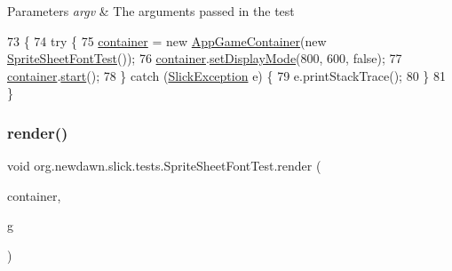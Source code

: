 \begin{DoxyParams}{Parameters}
{\em argv} & The arguments passed in the test \\
\hline
\end{DoxyParams}

\begin{DoxyCode}
73                                           \{
74       \textcolor{keywordflow}{try} \{
75          \mbox{\hyperlink{classorg_1_1newdawn_1_1slick_1_1tests_1_1_sprite_sheet_font_test_a815648868b0f6ece0eb2952a1faeaedf}{container}} = \textcolor{keyword}{new} \mbox{\hyperlink{classorg_1_1newdawn_1_1slick_1_1_app_game_container}{AppGameContainer}}(\textcolor{keyword}{new} 
      \mbox{\hyperlink{classorg_1_1newdawn_1_1slick_1_1tests_1_1_sprite_sheet_font_test_adf11cf3193647a23114886b5963e6616}{SpriteSheetFontTest}}());
76          \mbox{\hyperlink{classorg_1_1newdawn_1_1slick_1_1tests_1_1_sprite_sheet_font_test_a815648868b0f6ece0eb2952a1faeaedf}{container}}.\mbox{\hyperlink{classorg_1_1newdawn_1_1slick_1_1_app_game_container_aa2de68db61ddd3917a8edc0177ebdfe3}{setDisplayMode}}(800, 600, \textcolor{keyword}{false});
77          \mbox{\hyperlink{classorg_1_1newdawn_1_1slick_1_1tests_1_1_sprite_sheet_font_test_a815648868b0f6ece0eb2952a1faeaedf}{container}}.\mbox{\hyperlink{classorg_1_1newdawn_1_1slick_1_1_app_game_container_adcadc0e560e64d03be24c817931fdd54}{start}}();
78       \} \textcolor{keywordflow}{catch} (\mbox{\hyperlink{classorg_1_1newdawn_1_1slick_1_1_slick_exception}{SlickException}} e) \{
79          e.printStackTrace();
80       \}
81    \}
\end{DoxyCode}
\mbox{\label{classorg_1_1newdawn_1_1slick_1_1tests_1_1_sprite_sheet_font_test_ae5d38e883f23a0c129f0138eaa90af3e}} 
\subsubsection{\texorpdfstring{render()}{render()}}
{\footnotesize\ttfamily void org.\+newdawn.\+slick.\+tests.\+Sprite\+Sheet\+Font\+Test.\+render (\begin{DoxyParamCaption}\item[{\mbox{\hyperlink{classorg_1_1newdawn_1_1slick_1_1_game_container}{Game\+Container}}}]{container,  }\item[{\mbox{\hyperlink{classorg_1_1newdawn_1_1slick_1_1_graphics}{Graphics}}}]{g }\end{DoxyParamCaption})\hspace{0.3cm}{\ttfamily [inline]}}

